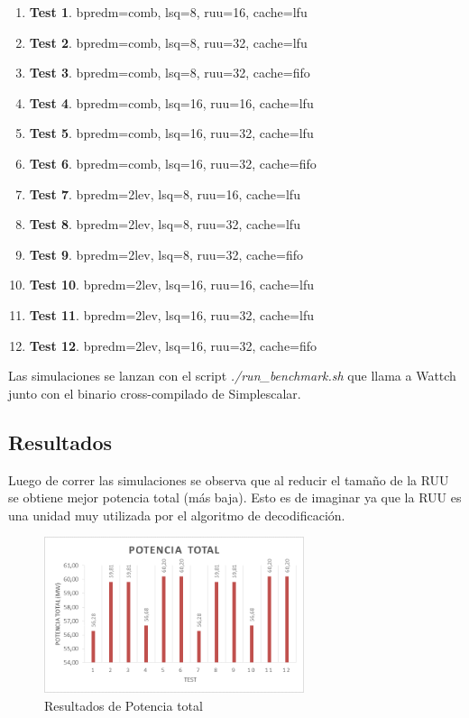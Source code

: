 \documentclass[journal]{IEEEtran}
\begin{document}
\begin{enumerate}
\item \textbf{Test 1}.  bpredm=comb, lsq=8, ruu=16, cache=lfu
\item \textbf{Test 2}.  bpredm=comb, lsq=8, ruu=32, cache=lfu
\item \textbf{Test 3}.  bpredm=comb, lsq=8, ruu=32, cache=fifo
\item \textbf{Test 4}.  bpredm=comb, lsq=16, ruu=16, cache=lfu
\item \textbf{Test 5}.  bpredm=comb, lsq=16, ruu=32, cache=lfu
\item \textbf{Test 6}.  bpredm=comb, lsq=16, ruu=32, cache=fifo
\item \textbf{Test 7}.  bpredm=2lev, lsq=8, ruu=16, cache=lfu
\item \textbf{Test 8}.  bpredm=2lev, lsq=8, ruu=32, cache=lfu
\item \textbf{Test 9}.  bpredm=2lev, lsq=8, ruu=32, cache=fifo
\item \textbf{Test 10}. bpredm=2lev, lsq=16, ruu=16, cache=lfu
\item \textbf{Test 11}. bpredm=2lev, lsq=16, ruu=32, cache=lfu
\item \textbf{Test 12}. bpredm=2lev, lsq=16, ruu=32, cache=fifo \newline
\end{enumerate}

Las simulaciones se lanzan con el script \textit{./run\_benchmark.sh} que llama a Wattch junto con el binario cross-compilado de Simplescalar.

\subsection{Resultados}

Luego de correr las simulaciones se observa que al reducir el tama\~{n}o de la RUU se obtiene mejor potencia total (m\'{a}s baja). Esto es de imaginar ya que la RUU es una unidad muy utilizada por el algoritmo de decodificaci\'{o}n.

\begin{figure}[!ht]
        \begin{center}
        \includegraphics[width=3in]{fig1.png}
        \caption{Resultados de Potencia total}
        \end{center}
\end{figure}
\end{document}
